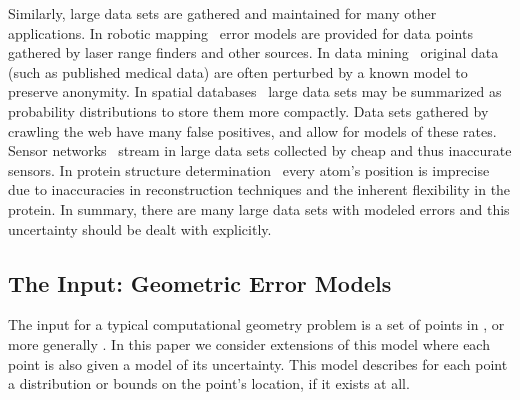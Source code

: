\documentclass{journal}
\begin{document}
Similarly, large data sets are gathered and maintained for many other applications.
In robotic mapping~\cite{Thr02,EP04} error models are provided for data points gathered by laser range finders and other sources.
In data mining~\cite{AY08,AS00} original data (such as published medical data) are often perturbed by a known model to preserve anonymity.
In spatial databases~\cite{GS05,SC01,CKP03} large data sets may be summarized as probability distributions to store them more compactly.
Data sets gathered by crawling the web have many false positives, and allow for models of these rates.  
Sensor networks~\cite{DGMHH04} stream in large data sets collected by cheap and thus inaccurate sensors.
In protein structure determination~\cite{PYCDB06} every atom's position is imprecise due to inaccuracies in reconstruction techniques and the inherent flexibility in the protein.
In summary, there are many large data sets with modeled errors and this uncertainty should be dealt with explicitly.  








\subsection {The Input: Geometric Error Models}

The input for a typical computational geometry problem is a set  of  points in , or more generally .  In this paper we consider extensions of this model where each point is also given a model of its uncertainty.  This model describes for each point a distribution or bounds on the point's location, if it exists at all.  
\end{document}
